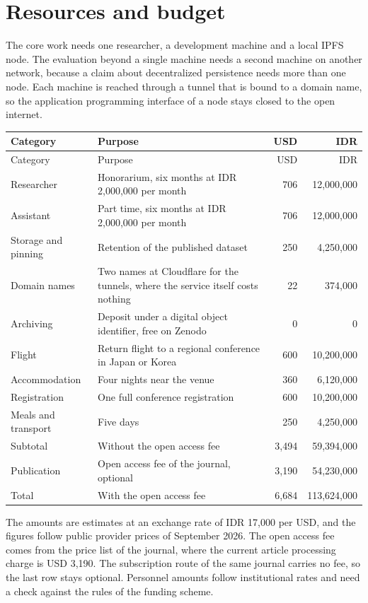 \documentclass[11pt,a4paper]{article}
\renewcommand{\arraystretch}{1.2}
\begin{document}
\section{Resources and budget}

The core work needs one researcher, a development machine and a local IPFS node. The evaluation beyond a single machine needs a second machine on another network, because a claim about decentralized persistence needs more than one node. Each machine is reached through a tunnel that is bound to a domain name, so the application programming interface of a node stays closed to the open internet.

{\renewcommand{\arraystretch}{1.05}
\begin{longtable}{@{}p{32mm}p{58mm}rr@{}}
\toprule
Category & Purpose & USD & IDR \\
\midrule
\endfirsthead
\toprule
Category & Purpose & USD & IDR \\
\midrule
\endhead
Researcher & Honorarium, six months at IDR 2,000,000 per month & 706 & 12,000,000 \\
Assistant & Part time, six months at IDR 2,000,000 per month & 706 & 12,000,000 \\
Storage and pinning & Retention of the published dataset & 250 & 4,250,000 \\
Domain names & Two names at Cloudflare for the tunnels, where the service itself costs nothing & 22 & 374,000 \\
Archiving & Deposit under a digital object identifier, free on Zenodo & 0 & 0 \\
Flight & Return flight to a regional conference in Japan or Korea & 600 & 10,200,000 \\
Accommodation & Four nights near the venue & 360 & 6,120,000 \\
Registration & One full conference registration & 600 & 10,200,000 \\
Meals and transport & Five days & 250 & 4,250,000 \\
\midrule
Subtotal & Without the open access fee & 3,494 & 59,394,000 \\
Publication & Open access fee of the journal, optional & 3,190 & 54,230,000 \\
Total & With the open access fee & 6,684 & 113,624,000 \\
\bottomrule
\end{longtable}}

The amounts are estimates at an exchange rate of IDR 17,000 per USD, and the figures follow public provider prices of September 2026. The open access fee comes from the price list of the journal, where the current article processing charge is USD 3,190. The subscription route of the same journal carries no fee, so the last row stays optional. Personnel amounts follow institutional rates and need a check against the rules of the funding scheme.
\end{document}
